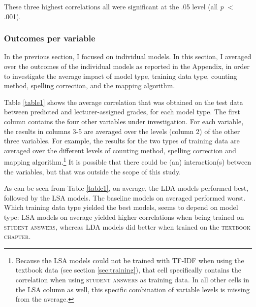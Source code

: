 \documentclass[a4paper,10pt,twoside]{article}
\begin{document}
These three highest correlations all were significant at the .05 level (all \textit{p} $<$ .001).

\subsubsection{Outcomes per variable}
In the previous section, I focused on individual models. In this section, I averaged over the outcomes of the individual models as reported in the Appendix, in order to investigate the average impact of model type, training data type, counting method, spelling correction, and the mapping algorithm. 

Table \ref{table1} shows the average correlation that was obtained on the test data between predicted and lecturer-assigned grades, for each model type. The first column contains the four other variables under investigation. For each variable, the results in columns 3-5 are averaged over the levels (column 2) of the other three variables. For example, the results for the two types of training data are averaged over the different levels of counting method, spelling correction and mapping algorithm.\footnote{Because the LSA models could not be trained with TF-IDF when using the textbook data (see section \ref{sec:training}), that cell specifically contains the correlation when using \textsc{student answers} as training data. In all other cells in the LSA column as well, this specific combination of variable levels is missing from the average.} It is possible that there could be (an) interaction(s) between the variables, but that was outside the scope of this study.

As can be seen from Table \ref{table1}, on average, the LDA models performed best, followed by the LSA models. The baseline models on averaged performed worst. Which training data type yielded the best models, seems to depend on model type: LSA models on average yielded higher correlations when being trained on \textsc{student answers}, whereas LDA models did better when trained on the \textsc{textbook chapter}.
\end{document}
